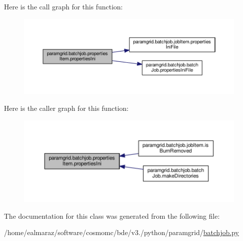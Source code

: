 Here is the call graph for this function\+:
\nopagebreak
\begin{figure}[H]
\begin{center}
\leavevmode
\includegraphics[width=350pt]{classparamgrid_1_1batchjob_1_1propertiesItem_af0d636693ae172d44b4bd11ecd7b2e26_cgraph}
\end{center}
\end{figure}
Here is the caller graph for this function\+:
\nopagebreak
\begin{figure}[H]
\begin{center}
\leavevmode
\includegraphics[width=350pt]{classparamgrid_1_1batchjob_1_1propertiesItem_af0d636693ae172d44b4bd11ecd7b2e26_icgraph}
\end{center}
\end{figure}


The documentation for this class was generated from the following file\+:\begin{DoxyCompactItemize}
\item 
/home/ealmaraz/software/cosmomc/bde/v3./python/paramgrid/\mbox{\hyperlink{batchjob_8py}{batchjob.\+py}}\end{DoxyCompactItemize}
